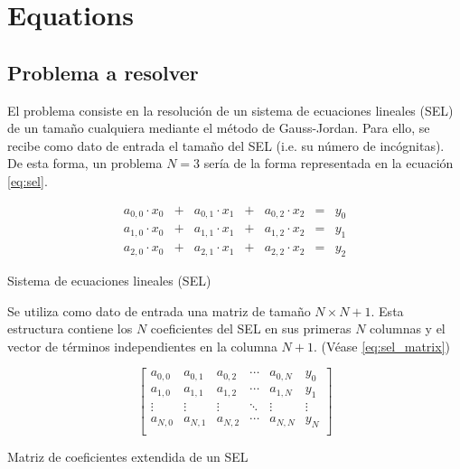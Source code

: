 \pagestyle{fancy}
\fancyhead[LO]{\autorR}
\fancyhead[LE]{\autorA}
\fancyhead[RE,RO]{\textit{\rightmark}}
\fancyfoot[L]{\asignaturaAbbr}
\fancyfoot[R]{\fecha}

\section{Equations}
\label{sec:Equations}

\subsection{Problema a resolver}

El problema consiste en la resolución de un sistema de ecuaciones lineales
(SEL) de un tamaño cualquiera mediante el método de Gauss-Jordan.
Para ello, se recibe como dato de entrada el tamaño del SEL
(i.e. su número de incógnitas).
De esta forma, un problema $N=3$ sería de la forma representada en la
ecuación \autoref{eq:sel}.

\begin{mycapequ}[h]
\begin{equation}
\begin{matrix}
    a_{0,0} \cdot x_0 & + & a_{0,1} \cdot x_1 & + & a_{0,2} \cdot x_2 & = & y_0 \\
    a_{1,0} \cdot x_0 & + & a_{1,1} \cdot x_1 & + & a_{1,2} \cdot x_2 & = & y_1 \\
    a_{2,0} \cdot x_0 & + & a_{2,1} \cdot x_1 & + & a_{2,2} \cdot x_2 & = & y_2
\end{matrix}
\end{equation}
\caption{Sistema de ecuaciones lineales (SEL)}
\label{eq:sel}
\end{mycapequ}

Se utiliza como dato de entrada una matriz de tamaño $N \times N+1$.
Esta estructura contiene los $N$ coeficientes del SEL en sus primeras $N$
columnas y el vector de términos independientes en la columna $N+1$.
(Véase \autoref{eq:sel_matrix})

\begin{mycapequ}[h]
\begin{equation}
    \begin{bmatrix}
        a_{0,0} & a_{0,1} & a_{0,2} & \cdots & a_{0,N} & y_0 \\
        a_{1,0} & a_{1,1} & a_{1,2} & \cdots & a_{1,N} & y_1 \\
        \vdots & \vdots & \vdots & \ddots & \vdots & \vdots \\
        a_{N,0} & a_{N,1} & a_{N,2} & \cdots & a_{N,N} & y_N \\
    \end{bmatrix}
\end{equation}
\caption{Matriz de coeficientes extendida de un SEL}
\label{eq:sel_matrix}
\end{mycapequ}


